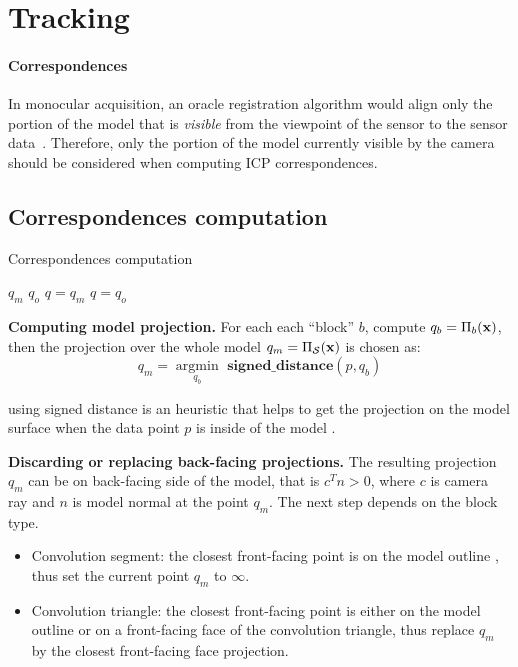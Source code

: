 \section{Tracking}

\paragraph{Correspondences}
In monocular acquisition, an oracle registration algorithm would align only the portion of the model that is \emph{visible} from the viewpoint of the sensor to the sensor data~\cite{tagliasacchi2015robust}. Therefore, only the portion of the model currently visible by the camera should be considered when computing ICP correspondences. 

\subsection*{Correspondences computation}

\begin{algorithm}
\caption{Correspondences computation }
\begin{algorithmic}[1]
  		 \State {} $q_m$
  		  \State {}
  		  \State {} $q_o$
  		  	\State $q = q_m$
  		  \Else
  		  	\State $q = q_o$
  		  \EndIf
	\EndFor
\end{algorithmic}
\label{alg:correspondences}
\end{algorithm}

\textbf{Computing model projection.}
For each each ``block'' $b$, compute $q_b = \Pi_b(\mathbf{x})$, then the
projection over the whole model $q_m = \Pi_{\mathcal{S}}(\mathbf{x})$ is chosen as: 
\begin{equation*}
	q_m = \underset{q_b}{\operatorname{argmin}}{ \textbf{ signed\_distance}(p, q_b)} 
\end{equation*}

using signed distance is an heuristic that helps to get the projection on the model surface when the data point $p$ is inside of the model .

\textbf{Discarding or replacing back-facing projections.}
The resulting projection $q_m$ can be on back-facing side of the model, that is $c^{T} n > 0$, where $c$ is camera ray and $n$ is model normal at the point $q_m$.
The next step depends on the block type. 
\begin{itemize}
	\item Convolution segment: the closest front-facing point is on the model outline , thus set the current point $q_m$ to $\infty$.
	\item Convolution triangle: the closest front-facing point is either on the model outline or on a front-facing face of the convolution triangle, thus replace $q_m$ by the closest front-facing face projection.
\end{itemize}


